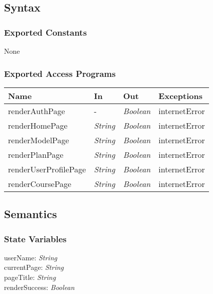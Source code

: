 \documentclass[12pt, titlepage]{article}
\begin{document}
\subsection{Syntax}

\subsubsection{Exported Constants}
None

\subsubsection{Exported Access Programs}

\begin{center}
\begin{tabular}{p{4cm} p{3cm} p{3cm} p{3cm}}
\hline
\textbf{Name} & \textbf{In} & \textbf{Out} & \textbf{Exceptions} \\
\hline
renderAuthPage&  - & \textit{Boolean} & internetError \\
renderHomePage&  \textit{String} & \textit{Boolean} & internetError \\
renderModelPage&  \textit{String} & \textit{Boolean} & internetError \\
renderPlanPage&  \textit{String} & \textit{Boolean} & internetError \\
renderUserProfilePage&  \textit{String} & \textit{Boolean} & internetError \\
renderCoursePage&  \textit{String} & \textit{Boolean} & internetError \\

\hline
\end{tabular}
\end{center}

\subsection{Semantics}

\subsubsection{State Variables}


userName: \textit{String}\\
currentPage: \textit{String}\\
pageTitle: \textit{String}\\
renderSuccess: \textit{Boolean}\\
\end{document}
